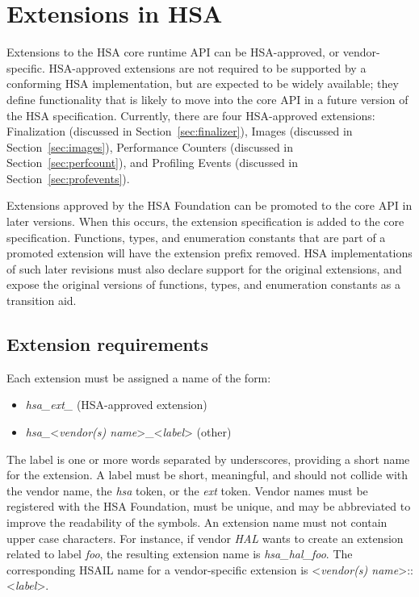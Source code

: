 \documentclass[oneside]{book}
\begin{document}
\section{Extensions in HSA}
Extensions to the HSA core runtime API can be HSA-approved, or vendor-specific.
HSA-approved extensions are not required to be supported by a conforming HSA
implementation, but are expected to be widely available; they define
functionality that is likely to move into the core API in a future version of
the HSA specification. Currently, there are four HSA-approved extensions:
Finalization (discussed in Section~\ref{sec:finalizer}), Images (discussed in
Section~\ref{sec:images}), Performance Counters (discussed in 
Section~\ref{sec:perfcount}), and Profiling Events (discussed in 
Section~\ref{sec:profevents}).

Extensions approved by the HSA Foundation can be promoted to the core API in
later versions. When this occurs, the extension specification is added to the
core specification. Functions, types, and enumeration constants that are part of
a promoted extension will have the extension prefix removed. HSA implementations
of such later revisions must also declare support for the original extensions,
and expose the original versions of functions, types, and enumeration constants
as a transition aid.

\subsection{Extension requirements}

Each extension must be assigned a name of the form:
\begin{itemize}[itemsep=1pt,topsep=3pt,partopsep=0pt]
\item \textit{hsa_ext_} (HSA-approved extension)
\item \textit{hsa_}<\textit{vendor(s) name}>_<\textit{label}> (other)
\end{itemize}
The label is one or more words separated by underscores, providing a short name
for the extension. A label must be short, meaningful, and should not collide
with the vendor name, the \textit{hsa} token, or the \textit{ext} token. Vendor
names must be registered with the HSA Foundation, must be unique, and may be
abbreviated to improve the readability of the symbols. An extension name must
not contain upper case characters. For instance, if vendor \textit{HAL} wants to
create an extension related to label \textit{foo}, the resulting extension name
is \textit{hsa_hal_foo}. The corresponding HSAIL name for a vendor-specific
extension is <\textit{vendor(s) name}>::<\textit{label}>.
\end{document}
